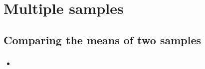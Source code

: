 \documentclass[t]{beamer} %
\begin{document}
\section{Multiple samples}

\subsection{Comparing the means of two samples}

\begin{frame}
  \frametitle{}

  \begin{itemize}
  \item 
  \end{itemize}

\end{frame}

\begin{frame}[fragile]
  \frametitle{}

  \begin{alltt}
  \end{alltt}
\end{frame}

\subsection{}

\begin{frame}
  \frametitle{}

\end{frame}

\begin{frame}[fragile]
  \frametitle{}

  \begin{alltt}
  \end{alltt}
\end{frame}

\section{}

\subsection{}
\end{document}

